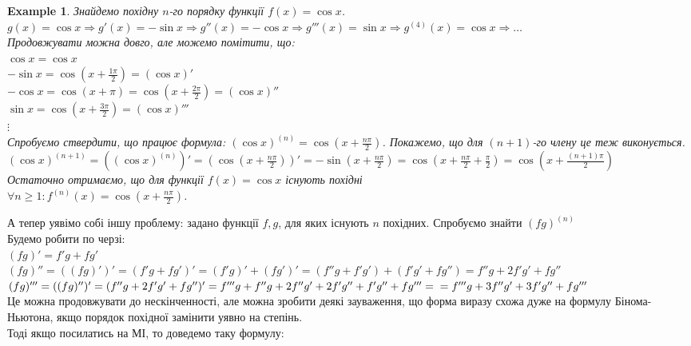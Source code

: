 \documentclass[a4paper, 14pt]{article}
\def\huge{\displaystyle}
\theoremstyle{theoremdd}
\theoremstyle{theoremdd}
\theoremstyle{theoremdd}
\theoremstyle{theoremdd}
\newtheorem{example}[theorem]{Example}
\theoremstyle{theoremdd}
\theoremstyle{theoremdd}
\theoremstyle{theoremdd}
\theoremstyle{theoremdd}
\begin{document}
\begin{example}
Знайдемо похідну $n$-го порядку функції $f(x) = \cos x$.\\
$g(x) = \cos x \Rightarrow g'(x) = -\sin x \Rightarrow g''(x) = -\cos x \Rightarrow g'''(x) = \sin x \Rightarrow g^{(4)}(x) = \cos x \Rightarrow \dots$\\
Продовжувати можна довго, але можемо помітити, що:\\
$\cos x = \cos x$\\
$- \sin x = \huge \cos \left(x + \frac{1\pi}{2} \right) = (\cos x)'$\\
$- \cos x = \huge \cos \left(x + \pi \right) = \cos \left(x + \frac{2 \pi}{2} \right) = (\cos x)''$\\
$ \sin x = \huge \cos \left(x + \frac{3\pi}{2} \right) = (\cos x)'''$\\
$\vdots$\\
Спробуємо ствердити, що працює формула: $(\cos x)^{(n)} = \huge \cos \left(x + \frac{n\pi}{2} \right)$. Покажемо, що для $(n+1)$-го члену це теж виконується.\\
$(\cos x)^{(n+1)} = \left((\cos x)^{(n)}\right)' = \huge \left( \cos \left(x + \frac{n\pi}{2} \right) \right)' = -\sin \left(x + \frac{n\pi}{2} \right) = \cos \left(x + \frac{n\pi}{2} + \frac{\pi}{2} \right) = \cos \left(x + \frac{(n+1)\pi}{2} \right)$\\
Остаточно отримаємо, що для функції $f(x) = \cos x$ існують похідні\\
$\forall n \geq 1: f^{(n)}(x) = \huge \cos \left(x + \frac{n\pi}{2} \right)$.
\end{example}

А тепер уявімо собі іншу проблему: задано функції $f,g$, для яких існують $n$ похідних. Спробуємо знайти $(fg)^{(n)}$\\
Будемо робити по черзі:\\
$(fg)' = f'g+fg'$\\
$(fg)''=((fg)')'=(f'g+fg')'=(f'g)'+(fg')'=(f''g+f'g')+(f'g'+fg'')= f''g + 2f'g' + fg''$\\
$(fg)''' = ((fg)'')' = (f''g + 2f'g' + fg'')' = f'''g+f''g+2f''g'+2f'g''+f'g''+fg''' = \\ = f'''g + 3f''g' + 3f'g'' + fg'''$\\
Це можна продовжувати до нескінченності, але можна зробити деякі зауваження, що форма виразу схожа дуже на формулу Бінома-Ньютона, якщо порядок похідної замінити уявно на степінь.\\
Тоді якщо посилатись на МІ, то доведемо таку формулу:
\end{document}
